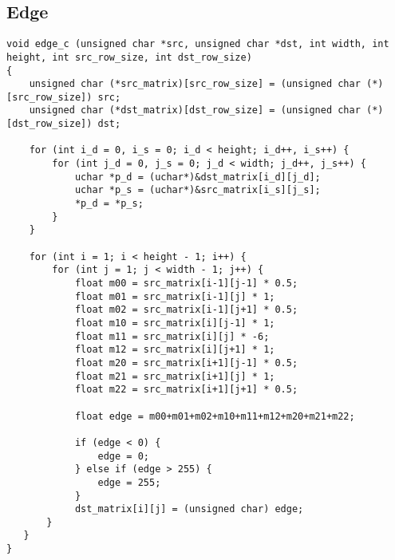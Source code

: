 \subsection{Edge}

\begin{codesnippet}
\begin{verbatim}
void edge_c (unsigned char *src, unsigned char *dst, int width, int height, int src_row_size, int dst_row_size)
{
    unsigned char (*src_matrix)[src_row_size] = (unsigned char (*)[src_row_size]) src;
    unsigned char (*dst_matrix)[dst_row_size] = (unsigned char (*)[dst_row_size]) dst;

    for (int i_d = 0, i_s = 0; i_d < height; i_d++, i_s++) {
        for (int j_d = 0, j_s = 0; j_d < width; j_d++, j_s++) {
            uchar *p_d = (uchar*)&dst_matrix[i_d][j_d];
            uchar *p_s = (uchar*)&src_matrix[i_s][j_s];
            *p_d = *p_s;
        }
    }

    for (int i = 1; i < height - 1; i++) {
        for (int j = 1; j < width - 1; j++) {
            float m00 = src_matrix[i-1][j-1] * 0.5;
            float m01 = src_matrix[i-1][j] * 1;
            float m02 = src_matrix[i-1][j+1] * 0.5;
            float m10 = src_matrix[i][j-1] * 1;
            float m11 = src_matrix[i][j] * -6;
            float m12 = src_matrix[i][j+1] * 1;
            float m20 = src_matrix[i+1][j-1] * 0.5;
            float m21 = src_matrix[i+1][j] * 1;
            float m22 = src_matrix[i+1][j+1] * 0.5;

            float edge = m00+m01+m02+m10+m11+m12+m20+m21+m22;

            if (edge < 0) {
                edge = 0;
            } else if (edge > 255) {
                edge = 255;
            }
            dst_matrix[i][j] = (unsigned char) edge;
       }
   }
}
\end{verbatim}
\end{codesnippet}
